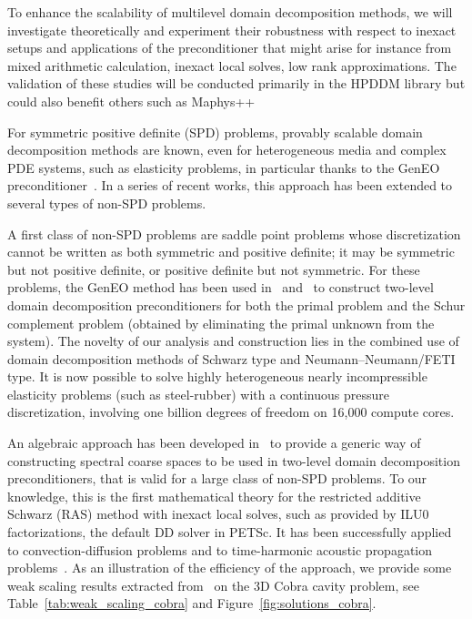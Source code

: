  
To enhance the scalability of
multilevel domain decomposition methods, we will investigate theoretically and experiment their
robustness with respect to inexact setups and applications of the preconditioner that might arise for
instance from mixed arithmetic calculation, inexact local solves, low rank approximations. The
validation of these studies will be conducted primarily in the HPDDM library but could also benefit
others such as Maphys++

\bigskip

For symmetric positive definite (SPD) problems, provably scalable domain decomposition methods are known, even for heterogeneous media and complex PDE systems, such as elasticity problems, in particular thanks to the GenEO preconditioner~\cite{Spillane:2014:ASC, Dolean:2015:IDDSiam}. In a series of recent works, this approach has been extended to several types of non-SPD problems.

A first class of non-SPD problems are saddle point problems whose discretization cannot be written as both symmetric and positive definite; it may be symmetric but not positive definite, or positive definite but not symmetric. For these problems, the GenEO method has been used in~\cite{nataf:hal-02343808} and~\cite{brunelli:hal-05123311} to construct two-level domain decomposition preconditioners for both the primal problem and the Schur complement problem (obtained by eliminating the primal unknown from the system). The novelty of our analysis and construction lies in the combined use of domain decomposition methods of Schwarz type and Neumann–Neumann/FETI type. It is now possible to solve highly heterogeneous nearly incompressible elasticity problems (such as steel-rubber) with a continuous pressure discretization, involving one billion degrees of freedom on 16,000 compute cores.

An algebraic approach has been developed in~\cite{nataf:hal-04536547} to provide a generic way of constructing spectral coarse spaces to be used in two-level domain decomposition preconditioners, that is valid for a large class of non-SPD problems. To our knowledge, this is the first mathematical theory for the restricted additive Schwarz (RAS) method with inexact local solves, such as provided by ILU0 factorizations, the default DD solver in PETSc. It has been successfully applied to convection-diffusion problems and to time-harmonic acoustic propagation problems~\cite{dolean:hal-05241475}. As an illustration of the efficiency of the approach, we provide some weak scaling results extracted from~\cite{dolean:hal-05241475} on the 3D Cobra cavity problem, see Table~\ref{tab:weak_scaling_cobra} and Figure~\ref{fig:solutions_cobra}. 

